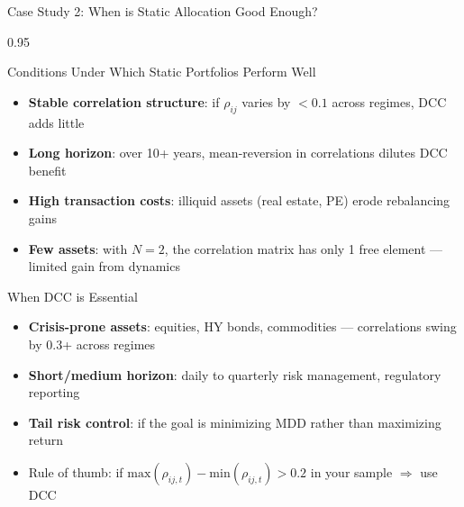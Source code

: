 \documentclass[9pt, aspectratio=169, t]{beamer}
\begin{document}
\begin{frame}{Case Study 2: When is Static Allocation Good Enough?}
    \begin{cminipage}{0.95\textwidth}
    {\footnotesize
    \begin{block}{Conditions Under Which Static Portfolios Perform Well}
        \begin{itemize}\setlength{\itemsep}{1pt}
            \item \textbf{Stable correlation structure}: if $\rho_{ij}$ varies by $< 0.1$ across regimes, DCC adds little
            \item \textbf{Long horizon}: over 10+ years, mean-reversion in correlations dilutes DCC benefit
            \item \textbf{High transaction costs}: illiquid assets (real estate, PE) erode rebalancing gains
            \item \textbf{Few assets}: with $N = 2$, the correlation matrix has only 1 free element --- limited gain from dynamics
        \end{itemize}
    \end{block}
    \begin{alertblock}{When DCC is Essential}
        \begin{itemize}\setlength{\itemsep}{0pt}
            \item \textbf{Crisis-prone assets}: equities, HY bonds, commodities --- correlations swing by 0.3+ across regimes
            \item \textbf{Short/medium horizon}: daily to quarterly risk management, regulatory reporting
            \item \textbf{Tail risk control}: if the goal is minimizing MDD rather than maximizing return
            \item Rule of thumb: if $\text{max}(\rho_{ij,t}) - \text{min}(\rho_{ij,t}) > 0.2$ in your sample $\Rightarrow$ use DCC
        \end{itemize}
    \end{alertblock}
    }
    \end{cminipage}
\end{frame}
\end{document}
